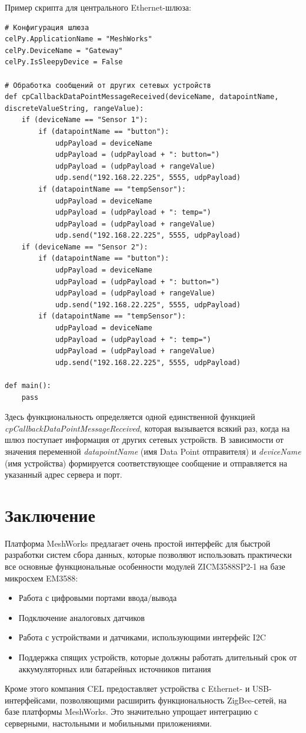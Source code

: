 \documentclass[12pt]{article}
\begin{document}
Пример скрипта для центрального Ethernet-шлюза:
\begin{verbatim}
# Конфигурация шлюза
celPy.ApplicationName = "MeshWorks"
celPy.DeviceName = "Gateway"
celPy.IsSleepyDevice = False

# Обработка сообщений от других сетевых устройств
def cpCallbackDataPointMessageReceived(deviceName, datapointName, discreteValueString, rangeValue):
    if (deviceName == "Sensor 1"):
        if (datapointName == "button"):
            udpPayload = deviceName
            udpPayload = (udpPayload + ": button=")
            udpPayload = (udpPayload + rangeValue)
            udp.send("192.168.22.225", 5555, udpPayload)
        if (datapointName == "tempSensor"): 
            udpPayload = deviceName
            udpPayload = (udpPayload + ": temp=")
            udpPayload = (udpPayload + rangeValue)
            udp.send("192.168.22.225", 5555, udpPayload) 
    if (deviceName == "Sensor 2"):
        if (datapointName == "button"):
            udpPayload = deviceName
            udpPayload = (udpPayload + ": button=")
            udpPayload = (udpPayload + rangeValue)
            udp.send("192.168.22.225", 5555, udpPayload)
        if (datapointName == "tempSensor"): 
            udpPayload = deviceName
            udpPayload = (udpPayload + ": temp=") 
            udpPayload = (udpPayload + rangeValue)
            udp.send("192.168.22.225", 5555, udpPayload)  
   
def main(): 
    pass

\end{verbatim}

Здесь функциональность определяется одной единственной функцией 
\emph{cpCallbackDataPointMessageReceived}, которая вызывается всякий раз, когда 
на шлюз поступает информация от других сетевых устройств. В зависимости от значения
переменной \emph{datapointName} (имя Data Point отправителя) и \emph{deviceName} (имя 
устройства) формируется соответствующее сообщение и отправляется на указанный адрес
сервера и порт.
\section{Заключение}
Платформа MeshWorks предлагает очень простой интерфейс для быстрой разработки систем
сбора данных, которые позволяют использовать практически все основные функциональные
особенности модулей ZICM3588SP2-1 на базе микросхем EM3588:
\begin{itemize}
 \item Работа с цифровыми портами ввода/вывода
 \item Подключение аналоговых датчиков
 \item Работа с устройствами и датчиками, использующими интерфейс I2C
 \item Поддержка спящих устройств, которые должны работать длительный срок от
 аккумуляторных или батарейных источников питания
\end{itemize}
Кроме этого компания CEL предоставляет устройства с Ethernet- и USB-интерфейсами, 
позволяющими расширить функциональность ZigBee-сетей, на базе платформы MeshWorks.
Это значительно упрощает интеграцию с серверными, настольными и мобильными приложениями.
\end{document}
